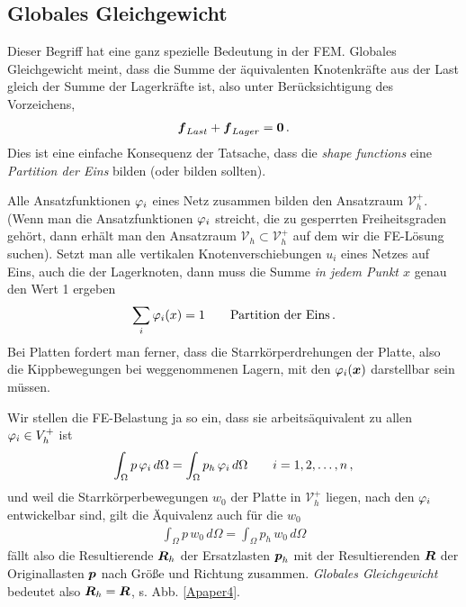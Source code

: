 {\textcolor{sectionTitleBlue}{\subsection{Globales Gleichgewicht}}}
{\small Dieser Begriff hat eine ganz spezielle Bedeutung in der FEM. Globales Gleichgewicht meint, dass die Summe der \"{a}quivalenten Knotenkr\"{a}fte aus der Last gleich der Summe der Lagerkr\"{a}fte ist, also unter Ber\"{u}cksichtigung des Vorzeichens,
\begin{align}
\mbox{\boldmath $f$}_{Last} + \mbox{\boldmath $f$}_{Lager} = \mbox{\boldmath $0$}\,.
\end{align}
Dies ist eine einfache Konsequenz der Tatsache, dass die {\em shape functions\/} eine {\em Partition der Eins\/} bilden (oder bilden sollten).

Alle Ansatzfunktionen $\varphi_i$ eines Netz zusammen bilden den Ansatzraum $\mathcal{V}_h^+$. (Wenn man die Ansatzfunktionen $\varphi_i$ streicht, die zu gesperrten Freiheitsgraden geh\"{o}rt, dann erh\"{a}lt man den Ansatzraum $\mathcal{V}_h \subset \mathcal{V}_h^+$ auf dem wir die FE-L\"{o}sung suchen). Setzt man alle vertikalen Knotenverschiebungen $u_i$ eines Netzes auf Eins, auch die der Lagerknoten, dann muss die Summe {\em in jedem Punkt $x$\/} genau den Wert 1 ergeben
\begin{align}
\sum_i \varphi_i(x) = 1 \qquad \text{Partition der Eins}\,.
\end{align}
Bei Platten fordert man ferner, dass die Starrk\"{o}rperdrehungen der Platte, also die Kippbewegungen bei weggenommenen Lagern, mit den $\varphi_i(\mbox{\boldmath $x$})$ darstellbar sein m\"{u}ssen.

Wir stellen die FE-Belastung ja so ein, dass sie arbeits\"{a}quivalent zu allen $\varphi_i \in V_h^+$ ist
\begin{align} \label{Eq1}
\int_{\Omega} p\,\varphi_i\,d\Omega = \int_{\Omega} p_h\,\varphi_i\,d\Omega\qquad i = 1,2,\ldots, n\,,
\end{align}
und weil die Starrk\"{o}rperbewegungen $w_0$ der Platte in
$\mathcal{V}_h^{+}$ liegen, nach den $\varphi_i$ entwickelbar sind, gilt die \"{A}quivalenz auch f\"{u}r die $w_0$
\begin{align}
\int_{\Omega} p\,w_0\,d\Omega = \int_{\Omega} p_h\,w_0\,d\Omega
\end{align}
f\"{a}llt also die Resultierende $\mbox{\boldmath $R$}_h$ der Ersatzlasten $\mbox{\boldmath $p$}_h$ mit der Resultierenden $\mbox{\boldmath $R$}$ der Originallasten $\mbox{\boldmath $p$}$ nach Gr\"{o}{\ss}e und Richtung zusammen. {\em Globales Gleichgewicht\/} bedeutet also $\mbox{\boldmath $R$}_h = \mbox{\boldmath $R$}$, s. Abb. \ref{Apaper4}.

}
